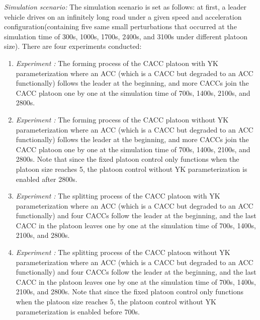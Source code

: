 \documentclass[journal]{IEEEtran}
\begin{document}
\textit{Simulation scenario:} The simulation scenario is set as follows: at first, a leader vehicle drives on an infinitely long road under a given speed and acceleration configuration(containing five same small perturbations that occurred at the simulation time of 300s, 1000s, 1700s, 2400s, and 3100s under different platoon size). There are four experiments conducted:
\begin{enumerate}
  \item \textit{Experiment \uppercase\expandafter{}:} The forming process of the CACC platoon with YK parameterization where an ACC (which is a CACC but degraded to an ACC functionally) follows the leader at the beginning, and more CACCs join the CACC platoon one by one at the simulation time of 700s, 1400s, 2100s, and 2800s.
  \item \textit{Experiment \uppercase\expandafter{}:} The forming process of the CACC platoon without YK parameterization where an ACC (which is a CACC but degraded to an ACC functionally) follows the leader at the beginning, and more CACCs join the CACC platoon one by one at the simulation time of 700s, 1400s, 2100s, and 2800s. Note that since the fixed platoon control only functions when the platoon size reaches 5, the platoon control without YK parameterization is enabled after 2800s.
  \item \textit{Experiment \uppercase\expandafter{}:} The splitting process of the CACC platoon with YK parameterization where an ACC (which is a CACC but degraded to an ACC functionally) and four CACCs follow the leader at the beginning, and the last CACC in the platoon leaves one by one at the simulation time of 700s, 1400s, 2100s, and 2800s.
  \item \textit{Experiment \uppercase\expandafter{}:} The splitting process of the CACC platoon without YK parameterization where an ACC (which is a CACC but degraded to an ACC functionally) and four CACCs follow the leader at the beginning, and the last CACC in the platoon leaves one by one at the simulation time of 700s, 1400s, 2100s, and 2800s. Note that since the fixed platoon control only functions when the platoon size reaches 5, the platoon control without YK parameterization is enabled before 700s.
\end{enumerate}
\end{document}

